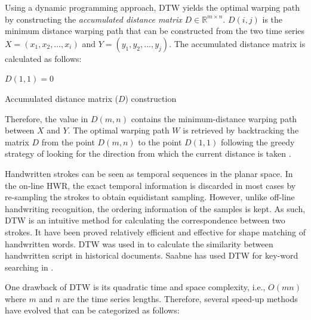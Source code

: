 \iftoggle{edit-mode}{\hspace{0pt}\marginpar{Accumulated distance matrix}}{}
Using a dynamic programming approach, DTW yields the optimal warping path by constructing the \emph{accumulated distance matrix} $D \in \mathds{R}^{m \times n}$. 
$D(i,j)$ is the minimum distance warping path that can be constructed from the two time series $X = \left( {{x_1},{x_2},...,{x_i}} \right)$ and $Y = \left( {{y_1},{y_2},...,{y_j}} \right)$.
The accumulated distance matrix is calculated as follows: 
\begin{algorithm}
$D(1,1) = 0$\;
\caption{Accumulated distance matrix ($D$) construction}
\label{alg:adm_dtw}
\end{algorithm}
Therefore, the value in $D(m,n)$ contains the minimum-distance warping path between $X$ and $Y$.
The optimal warping path $W$ is retrieved by backtracking the matrix $D$ from the point $D(m,n)$ to the point $D(1,1)$ following the greedy strategy of looking for the direction from which the current distance is taken \cite{senin2008dynamic}.

\iftoggle{edit-mode}{\hspace{0pt}\marginpar{stroke trajectories similarity measure using DTW}}{}
Handwritten strokes can be seen as temporal sequences in the planar space. 
In the on-line HWR, the exact temporal information is discarded in most cases by re-sampling the strokes to obtain equidistant sampling. 
However, unlike off-line handwriting recognition, the ordering information of the samples is kept. 
As such, DTW is an intuitive method for calculating the correspondence between two strokes. 
It have been proved relatively efficient and effective for shape matching of handwritten words. 
DTW was used in \cite{rath2003word, rath2003indexing, moghaddam2009application} to calculate the similarity between handwritten script in historical documents. 
Saabne has used DTW for key-word searching in \cite{saabni2011fast, saabni2008keyword}.


\iftoggle{edit-mode}{\hspace{0pt}\marginpar{DTW Speedup}}{}
One drawback of DTW is its quadratic time and space complexity, i.e., $O(mn)$ where $m$ and $n$ are the time series lengths. 
Therefore, several speed-up methods have evolved that can be categorized as follows:

